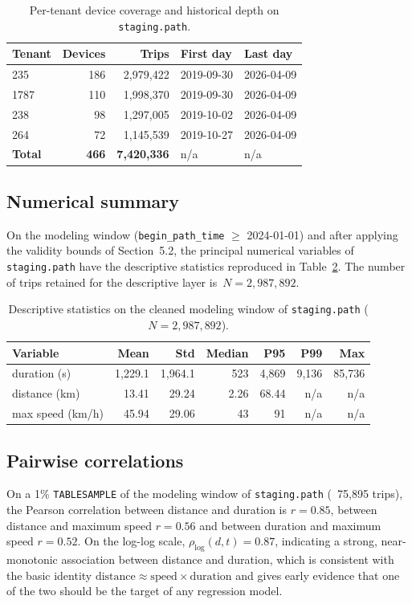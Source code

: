 \begin{table}[h]
\centering
\caption{Per-tenant device coverage and historical depth on \texttt{staging.path}.}
\label{tab:tenants}
\begin{tabular}{|l|r|r|l|l|}
\hline
\textbf{Tenant} & \textbf{Devices} & \textbf{Trips} & \textbf{First day} & \textbf{Last day} \\
\hline
235  & 186 & 2{,}979{,}422 & 2019-09-30 & 2026-04-09 \\
1787 & 110 & 1{,}998{,}370 & 2019-09-30 & 2026-04-09 \\
238  &  98 & 1{,}297{,}005 & 2019-10-02 & 2026-04-09 \\
264  &  72 & 1{,}145{,}539 & 2019-10-27 & 2026-04-09 \\
\hline
\textbf{Total} & \textbf{466} & \textbf{7{,}420{,}336} & n/a & n/a \\
\hline
\end{tabular}
\end{table}

\subsection{Numerical summary}
On the modeling window (\texttt{begin\_path\_time} $\ge$ 2024-01-01) and after applying the validity bounds of Section~5.2, the principal numerical variables of \texttt{staging.path} have the descriptive statistics reproduced in Table~\ref{tab:descriptive}. The number of trips retained for the descriptive layer is~$N=2{,}987{,}892$.

\begin{table}[h]
\centering
\caption{Descriptive statistics on the cleaned modeling window of \texttt{staging.path} ($N=2{,}987{,}892$).}
\label{tab:descriptive}
\begin{tabular}{|l|r|r|r|r|r|r|}
\hline
\textbf{Variable} & \textbf{Mean} & \textbf{Std} & \textbf{Median} & \textbf{P95} & \textbf{P99} & \textbf{Max} \\
\hline
duration (s)   & 1{,}229.1 & 1{,}964.1 &   523 & 4{,}869 & 9{,}136 & 85{,}736 \\
distance (km)  &     13.41 &    29.24  &  2.26 &  68.44 & n/a     & n/a \\
max speed (km/h) &   45.94 &    29.06  &    43 &     91 & n/a     & n/a \\
\hline
\end{tabular}
\end{table}

\subsection{Pairwise correlations}
On a 1\% \texttt{TABLESAMPLE} of the modeling window of \texttt{staging.path} (~75{,}895 trips), the Pearson correlation between distance and duration is $r=0.85$, between distance and maximum speed $r=0.56$ and between duration and maximum speed $r=0.52$. On the log-log scale, $\rho_{\log}(d, t) = 0.87$, indicating a strong, near-monotonic association between distance and duration, which is consistent with the basic identity $\text{distance} \approx \text{speed} \times \text{duration}$ and gives early evidence that one of the two should be the target of any regression model.

